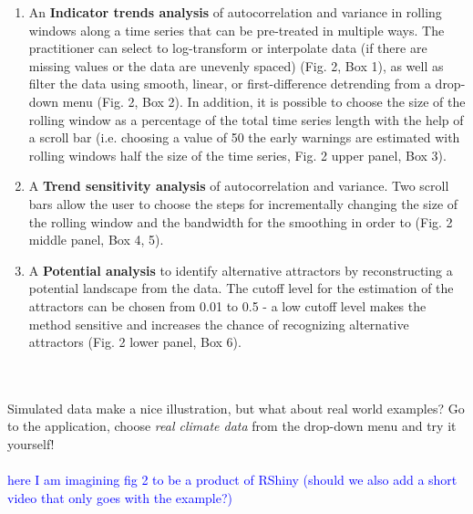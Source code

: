 \documentclass[12pt,a4paper,final]{article}
\begin{document}
\begin{enumerate}
\item An \textbf{Indicator trends analysis} of autocorrelation and variance in rolling windows along a time series that can be pre-treated in multiple ways. The practitioner can select to log-transform or interpolate data (if there are missing values or the data are unevenly spaced) (Fig. 2, Box 1), as well as filter the data using smooth, linear, or first-difference detrending from a drop-down menu (Fig. 2, Box 2). In addition, it is possible to choose the size of the rolling window as a percentage of the total time series length with the help of a scroll bar (i.e. choosing a value of 50 the early warnings are estimated with rolling windows half the size of the time series, Fig. 2 upper panel, Box 3).
\item A  \textbf{Trend sensitivity analysis} of autocorrelation and variance. Two scroll bars allow the user to choose the steps for incrementally changing the size of the rolling window and the bandwidth for the smoothing in order to (Fig. 2 middle panel, Box 4, 5). 
\item A \textbf{Potential analysis} to identify alternative attractors by reconstructing a potential landscape from the data. The cutoff level for the estimation of the attractors can be chosen from 0.01 to 0.5 - a low cutoff level makes the method sensitive and increases the chance of recognizing alternative attractors (Fig. 2 lower panel, Box 6).
\end{enumerate}
\\
\\
Simulated data make a nice illustration, but what about real world examples? Go to the application, choose \textit{real climate data} from the drop-down menu and try it yourself!
\\
\\
\textcolor{blue}{here I am imagining fig 2 to be a product of RShiny (should we also add a short video that only goes with the example?)}
\end{document}
